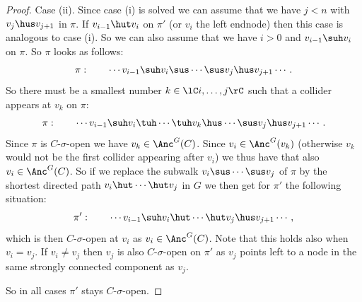 \begin{Lem}
\begin{proof}
 Case (ii). Since case (i) is solved we can assume that we have $j<n$ with $v_j \hus v_{j+1}$ in $\pi$. 
 If $v_{i-1} \hut v_i$ on $\pi'$ (or $v_i$ the left endnode) then this case is analogous to case (i). 
 So we can also assume that we have $i > 0$ and $v_{i-1} \suh v_i$ on $\pi$. So $\pi$ looks as follows:
 \[\pi:\qquad \cdots v_{i-1} \suh v_i \sus \cdots \sus v_j \hus v_{j+1} \cdots. \]
 So there must be a smallest number $k \in \lC i,\dots,j\rC$ such that a collider appears at $v_k$ on $\pi$:
 \[\pi:\qquad \cdots v_{i-1} \suh v_i \tuh \cdots \tuh v_k \hus \cdots \sus v_j \hus v_{j+1} \cdots. \]
 Since $\pi$ is $C$-$\sigma$-open we have $v_k \in \Anc^G(C)$. Since $v_i \in \Anc^G(v_k)$ (otherwise $v_k$ would not be the first collider appearing after $v_i$) we thus have that also $v_i \in \Anc^G(C)$.
 So if we replace the subwalk $v_i \sus \cdots \sus v_j$ of $\pi$ by the shortest directed path $v_i \hut \cdots \hut v_j$ in $G$ we then get for $\pi'$ the following situation:
 \[\pi':\qquad \cdots v_{i-1} \suh v_i \hut \cdots \hut  v_j \hus v_{j+1} \cdots, \]
 which is then $C$-$\sigma$-open at $v_i$ as $v_i \in \Anc^G(C)$. Note that this holds also when $v_i=v_j$.
 If $v_i \neq v_j$ then $v_j$ is also $C$-$\sigma$-open on $\pi'$ as $v_j$ points left to a node in the same strongly connected component as $v_j$. 

 So in all cases $\pi'$ stays $C$-$\sigma$-open.
\end{proof}
\end{Lem}



